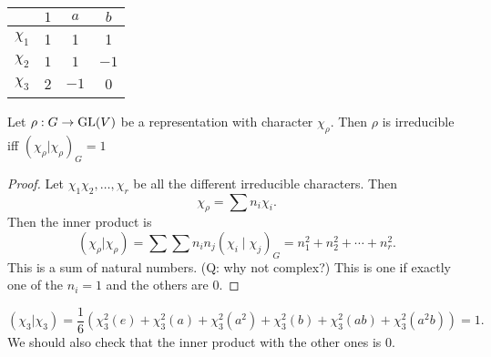 \begin{eg}
    \begin{center}
    \begin{tabular}{cccc}
        & $1$ &  $a$ &  $b$ \\ \hline
        $\chi_{1}$ & 1& 1 & 1\\
        $\chi_{2}$ &$1$ & $1$& $-1$\\
        $\chi_{3}$ & 2& $-1$& 0\\
    \end{tabular}
    \end{center}

\end{eg}


\begin{prop}
    Let $\rho: G \to \operatorname{GL}(V)$ be a representation with character $\chi_\rho$.
    Then  $\rho$ is irreducible iff $(\chi_{\rho} | \chi_{\rho})_G = 1$
\end{prop}
\begin{proof}
    Let $\chi_1 \chi_{2}, \ldots, \chi_{r}$ be all the different irreducible characters.
    Then
    \[
    \chi_{\rho} = \sum n_i \chi_{i}
    .\] 
    Then the inner product is
    \[
        (\chi_{\rho} | \chi_{\rho}) = \sum \sum n_i n_j (\chi_{i}  \mid  \chi_{j})_G = n_1^2 + n_2^2 + \cdots + n_r^2
    .\] 
    This is a sum of natural numbers. (Q: why not complex?)
    This is one if exactly one of the $n_i = 1$ and the others are  $0$.
\end{proof}

\begin{eg}
    \[
        (\chi_{3} | \chi_{3}) = \frac{1}{6} (
        \chi_{3}^2(e) + 
        \chi_{3}^2(a) + 
        \chi_{3}^2(a^2) + 
        \chi_{3}^2(b) + 
        \chi_{3}^2(ab) + 
        \chi_{3}^2(a^2b)
        ) = 1
    .\] 
    We should also check that the inner product with the other ones is $0$.
\end{eg}
